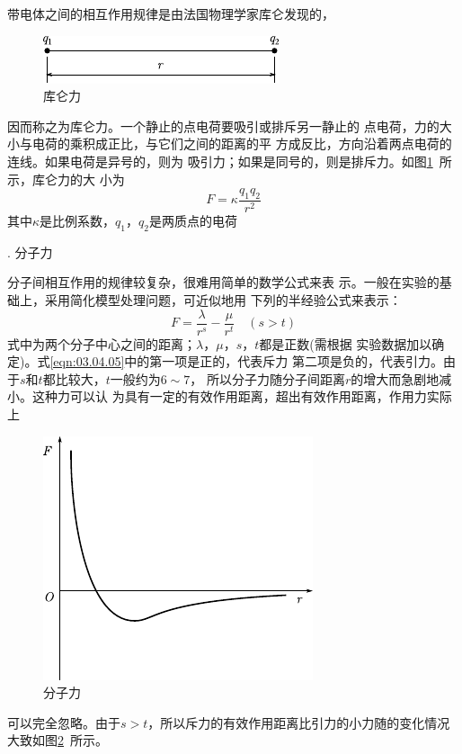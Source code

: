带电体之间的相互作用规律是由法国物理学家库仑发现的，
\begin{figure}
    \includegraphics{figure/fig03.06}
    \caption{库仑力}
    \label{fig:03.06}
\end{figure}
因而称之为库仑力。一个静止的点电荷要吸引或排斥另一静止的
点电荷，力的大小与电荷的乘积成正比，与它们之间的距离的平
方成反比，方向沿着两点电荷的连线。如果电荷是异号的，则为
吸引力；如果是同号的，则是排斥力。如图\ref{fig:03.06}~所示，库仑力的大
小为
\begin{equation}\label{eqn:03.04.04}
    F = \kappa \frac { q _ { 1 } q _ { 2 } } { r ^ { 2 } }
\end{equation}
其中$ \kappa $是比例系数，$  q _ { 1 } $，$  q _ { 2 } $是两质点的电荷

. 分子力 \normalfont

分子间相互作用的规律较复杂，很难用简单的数学公式来表
示。一般在实验的基础上，采用简化模型处理问题，可近似地用
下列的半经验公式来表示：
\begin{equation}\label{eqn:03.04.05}
    F = \frac { \lambda } { r ^ { s } } - \frac { \mu } { r ^ t } \quad ( s > t )
\end{equation}
式中为两个分子中心之间的距离；$\lambda$，$\mu$，$ s $，$ t $都是正数(需根据
实验数据加以确定)。式\eqref{eqn:03.04.05}中的第一项是正的，代表斥力
第二项是负的，代表引力。由于$ s $和$ t $都比较大，$ t $一般约为$ 6\sim 7 $，
所以分子力随分子间距离$ r $的增大而急剧地减小。这种力可以认
为具有一定的有效作用距离，超出有效作用距离，作用力实际上
\begin{figure}
    \includegraphics{figure/fig03.07}
    \caption{分子力}
    \label{fig:03.07}
\end{figure}
可以完全忽略。由于$  s > t   $，所以斥力的有效作用距离比引力的小力随的变化情况大致如图\ref{fig:03.07}~所示。

